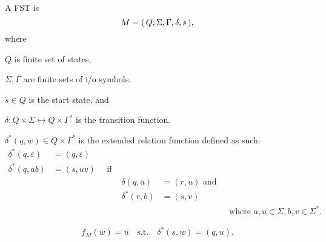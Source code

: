 \begin{definition}
    A FST is 
    \[
        M = { \left(\, Q,\Sigma,\Gamma,\delta,s \,\right) }
    ,\]
    where
    \begin{compactitem}
    \item $Q$ is finite set of states,
    \item $\Sigma, \Gamma$ are finite sets of i/o symbols,
    \item $s \in Q$ is the start state, and
    \item $\delta \colon Q \times \Sigma \mapsto Q \times \Gamma^*$
        is the transition function.
    \end{compactitem}
\end{definition}

\begin{definition}
    $
    \delta^*(q,w) \in Q \times \Gamma^*
    $
    is the extended relation function defined as such:
    \begin{align*}
        \delta^*(q,\varepsilon) &= (q,\varepsilon) \\
        \delta^*(q,ab)          &= (s,uv) \quad \text{ if } \\
                                && \delta(q,a)   &= (r,u) \text{ and } \\
                                && \delta^*(r,b) &= (s,v) \\
                                &&&& \text{ where $a,u \in \Sigma, b,v \in \Sigma^*$}
    .\end{align*}
\end{definition}

\[
    f_M(w) = u \quad\text{s.t.}\quad \delta^*(s,w) = (q,u)
.\]

